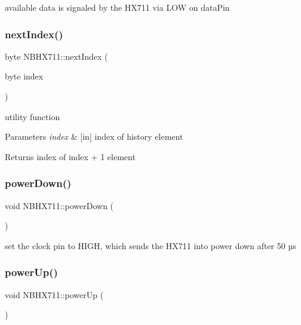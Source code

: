 available data is signaled by the H\+X711 via L\+OW on data\+Pin \mbox{\label{class_n_b_h_x711_a05ef1302bf8ffd0dfcafe3120c9be835}} 
\subsubsection{\texorpdfstring{next\+Index()}{nextIndex()}}
{\footnotesize\ttfamily byte N\+B\+H\+X711\+::next\+Index (\begin{DoxyParamCaption}\item[{byte}]{index }\end{DoxyParamCaption})\hspace{0.3cm}{\ttfamily [protected]}}

utility function 
\begin{DoxyParams}{Parameters}
{\em index} & \mbox{[}in\mbox{]} index of history element \\
\hline
\end{DoxyParams}
\begin{DoxyReturn}{Returns}
index of index + 1 element 
\end{DoxyReturn}
\mbox{\label{class_n_b_h_x711_ae531f57831caddf1d06d25f058066098}} 
\subsubsection{\texorpdfstring{power\+Down()}{powerDown()}}
{\footnotesize\ttfamily void N\+B\+H\+X711\+::power\+Down (\begin{DoxyParamCaption}{ }\end{DoxyParamCaption})}

set the clock pin to H\+I\+GH, which sends the H\+X711 into power down after 50 µs \mbox{\label{class_n_b_h_x711_aeeefc08264440e1d0ef11d592f96ef68}} 
\subsubsection{\texorpdfstring{power\+Up()}{powerUp()}}
{\footnotesize\ttfamily void N\+B\+H\+X711\+::power\+Up (\begin{DoxyParamCaption}{ }\end{DoxyParamCaption})}

